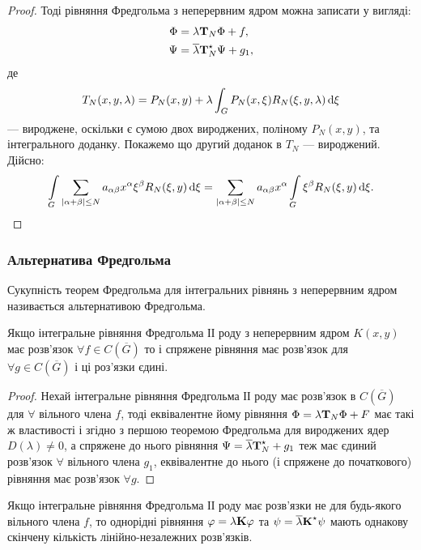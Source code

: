 \begin{proof}
	Тоді рівняння Фредгольма з неперервним ядром можна записати у вигляді:
	\begin{align}
		\Phi &= \lambda \bf{T}_N \Phi + f, \\
		\Psi &= \overline \lambda \bf{T}_N^\star \Psi + g_1,
	\end{align}
	де 
	\begin{equation}
		T_N(x, y, \lambda) = P_N(x, y) + \lambda \int_G P_N(x, \xi) R_N(\xi, y, \lambda) \diff \xi
	\end{equation}
	--- вироджене, оскільки є сумою двох вироджених, поліному $P_N(x, y)$, та інтегрального доданку. Покажемо що другий доданок в $T_N$ --- вироджений. Дійсно:
	\begin{equation}
		\Int_G \Sum_{|\alpha + \beta| \le N} a_{\alpha \beta} x^\alpha \xi^\beta R_N(\xi, y) \diff \xi = \Sum_{|\alpha + \beta| \le N} a_{\alpha \beta} x^\alpha \Int_G \xi^\beta R_N(\xi, y) \diff \xi.
	\end{equation}
\end{proof}

\subsubsection{Альтернатива Фредгольма}

Сукупність теорем Фредгольма для інтегральних рівнянь з неперервним ядром називається альтернативою Фредгольма.

\begin{theorem}
	Якщо інтегральне рівняння Фредгольма ІІ роду з неперервним ядром $K(x, y)$ має розв'язок $\forall f \in C\left(\overline G\right)$ то і спряжене рівняння має розв'язок для $\forall g \in C(\overline G)$ і ці роз'язки єдині.
\end{theorem}

\begin{proof}
	Нехай інтегральне рівняння Фредгольма ІІ роду має розв'язок в $C\left(\overline G\right)$ для $\forall$ вільного члена $f$, тоді еквівалентне йому рівняння $\Phi = \lambda \bf{T}_N \Phi + F$ має такі ж властивості і згідно з першою теоремою Фредгольма для вироджених ядер $D(\lambda) \ne 0$, а спряжене до нього рівняння $\Psi = \overline \lambda \bf{T}_N^\star  + g_1$ теж має єдиний розв'язок $\forall$ вільного члена $g_1$, еквівалентне до нього (і спряжене до початкового) рівняння має розв'язок $\forall g$.
\end{proof}

\begin{theorem}
	Якщо інтегральне рівняння Фредгольма ІІ роду має розв'язки не для будь-якого вільного члена $f$, то однорідні рівняння $\phi = \lambda \bf{K} \phi$ та $\psi = \overline \lambda \bf{K}^\star \psi$ мають однакову скінчену кількість лінійно-незалежних розв'язків.
\end{theorem}

